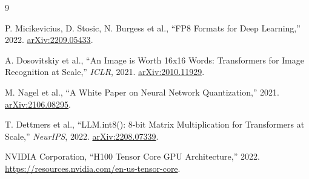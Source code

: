 \documentclass[12pt,a4paper]{article}
\begin{document}
\begin{thebibliography}{9}

P. Micikevicius, D. Stosic, N. Burgess et al.,
``FP8 Formats for Deep Learning,''
2022. \href{https://arxiv.org/abs/2209.05433}{arXiv:2209.05433}.

A. Dosovitskiy et al.,
``An Image is Worth 16x16 Words: Transformers for Image Recognition at Scale,''
\emph{ICLR}, 2021. \href{https://arxiv.org/abs/2010.11929}{arXiv:2010.11929}.

M. Nagel et al.,
``A White Paper on Neural Network Quantization,''
2021. \href{https://arxiv.org/abs/2106.08295}{arXiv:2106.08295}.

T. Dettmers et al.,
``LLM.int8(): 8-bit Matrix Multiplication for Transformers at Scale,''
\emph{NeurIPS}, 2022. \href{https://arxiv.org/abs/2208.07339}{arXiv:2208.07339}.

NVIDIA Corporation,
``H100 Tensor Core GPU Architecture,''
2022. \url{https://resources.nvidia.com/en-us-tensor-core}.

\end{thebibliography}
\end{document}
